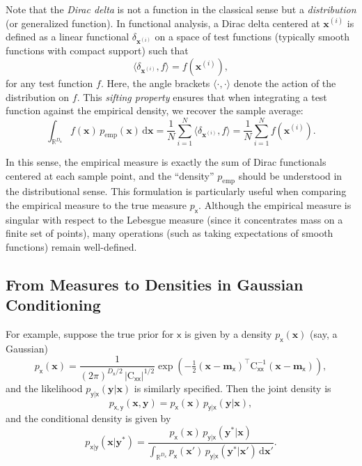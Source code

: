 \documentclass[wcp]{jmlr} %
\newcommand{\vv}[1]{\boldsymbol{#1}}
\newcommand{\mm}[1]{\mathrm{#1}}
\newcommand{\rv}[1]{\mathsf{#1}}
\newcommand{\vrv}[1]{\vv{\rv{#1}}}
\begin{document}
Note that the \emph{Dirac delta} is not a function in the classical sense but a \emph{distribution} (or generalized function). In functional analysis, a Dirac delta centered at \(\vv{x}^{(i)}\) is defined as a linear functional \(\delta_{\vv{x}^{(i)}}\) on a space of test functions (typically smooth functions with compact support) such that
\begin{equation}
    \langle \delta_{\vv{x}^{(i)}}, f \rangle = f(\vv{x}^{(i)}),
\end{equation}
for any test function \(f\). Here, the angle brackets \(\langle \cdot,\cdot \rangle\) denote the action of the distribution on \(f\). This \emph{sifting property} ensures that when integrating a test function against the empirical density, we recover the sample average:
\begin{equation}
    \int_{\mathbb{R}^{D_{\vrv{x}}}} f(\vv{x})\,p_{\text{emp}}(\vv{x})\,\mathrm{d}\vv{x}
    = \frac{1}{N} \sum_{i=1}^N \langle \delta_{\vv{x}^{(i)}}, f \rangle
    = \frac{1}{N} \sum_{i=1}^N f(\vv{x}^{(i)}).
\end{equation}

In this sense, the empirical measure is exactly the sum of Dirac functionals centered at each sample point, and the “density” \(p_{\text{emp}}\) should be understood in the distributional sense. This formulation is particularly useful when comparing the empirical measure to the true measure \(p_{\vrv{x}}\). Although the empirical measure is singular with respect to the Lebesgue measure (since it concentrates mass on a finite set of points), many operations (such as taking expectations of smooth functions) remain well-defined.

\subsection*{From Measures to Densities in Gaussian Conditioning}

For example, suppose the true prior for \(\vrv{x}\) is given by a density \(p_{\vrv{x}}(\vv{x})\) (say, a Gaussian)
\[
    p_{\vrv{x}}(\vv{x}) = \frac{1}{(2\pi)^{D_{\vrv{x}}/2} \,|\mm{C}_{\vrv{xx}}|^{1/2}} \exp\!\left(-\tfrac{1}{2}(\vv{x}-\vv{m}_{\vrv{x}})^\top \mm{C}_{\vrv{xx}}^{-1} (\vv{x}-\vv{m}_{\vrv{x}})\right),
\]
and the likelihood \(p_{\vrv{y}|\vrv{x}}(\vv{y}|\vv{x})\) is similarly specified. Then the joint density is
\begin{equation}
    p_{\vrv{x},\vrv{y}}(\vv{x},\vv{y})
    = p_{\vrv{x}}(\vv{x})\,p_{\vrv{y}|\vrv{x}}(\vv{y}|\vv{x}),
\end{equation}
and the conditional density is given by
\begin{equation}
    p_{\vrv{x}|\vrv{y}}(\vv{x}|\vv{y}^*)
    = \frac{p_{\vrv{x}}(\vv{x})\,p_{\vrv{y}|\vrv{x}}(\vv{y}^*|\vv{x})}{\int_{\mathbb{R}^{D_{\vrv{x}}}} p_{\vrv{x}}(\vv{x}')\,p_{\vrv{y}|\vrv{x}}(\vv{y}^*|\vv{x}')\,\mathrm{d}\vv{x}'}.
\end{equation}
\end{document}
